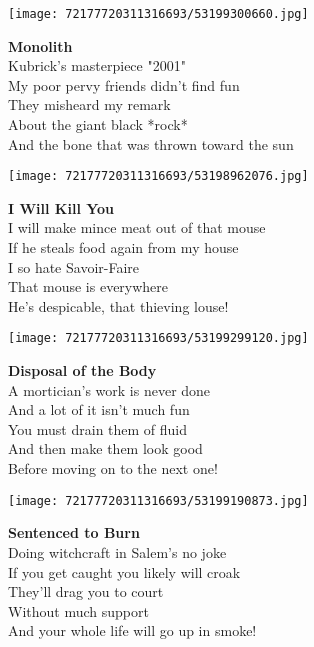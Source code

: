 \documentclass[10pt,letterpaper]{article}
\begin{document}
\begin{center}
\texttt{[image: 72177720311316693/53199300660.jpg]}
\end{center}

\begin{center}
\textbf{Monolith}\\
\vskip 0.2in
Kubrick's masterpiece "2001"\\
My poor pervy friends didn't find fun\\
They misheard my remark\\
About the giant black *rock*\\
And the bone that was thrown toward the sun\\
\end{center}
\pagebreak

\begin{center}\texttt{[image: 72177720311316693/53198962076.jpg]}
\end{center}
\begin{center}
\textbf{I Will Kill You}\\
\vskip 0.2in
I will make mince meat out of that mouse\\
If he steals food again from my house\\
I so hate Savoir-Faire\\
That mouse is everywhere\\
He's despicable, that thieving louse!\\
\end{center}
\pagebreak

\begin{center}\texttt{[image: 72177720311316693/53199299120.jpg]}
\end{center}
\begin{center}
\textbf{Disposal of the Body}\\
\vskip 0.2in
A mortician's work is never done\\
And a lot of it isn't much fun\\
You must drain them of fluid\\
And then make them look good\\
Before moving on to the next one!\\
\end{center}
\pagebreak

\begin{center}\texttt{[image: 72177720311316693/53199190873.jpg]}
\end{center}
\begin{center}
\textbf{Sentenced to Burn}\\
\vskip 0.2in
Doing witchcraft in Salem's no joke\\
If you get caught you likely will croak\\
They'll drag you to court\\
Without much support\\
And your whole life will go up in smoke!\\
\end{center}
\pagebreak
\end{document}
